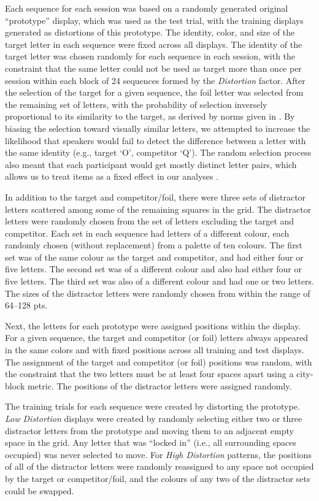 \documentclass[natbib,doc,a4paper]{apa6}
\begin{document}
Each sequence for each session was based on a randomly generated original ``prototype'' display, which was used as the test trial, with the training displays generated as distortions of this prototype.  The identity, color, and size of the target letter in each sequence were fixed across all displays. The identity of the target letter was chosen randomly for each sequence in each session, with the constraint that the same letter could not be used as target more than once per session within each block of 24 sequences formed by the \emph{Distortion} factor. After the selection of the target for a given sequence, the foil letter was selected from the remaining set of letters, with the probability of selection inversely proportional to its similarity to the target, as derived by norms given in \cite{simpson2013letter}.  By biasing the selection toward visually similar letters, we attempted to increase the likelihood that speakers would fail to detect the difference between a letter with the same identity (e.g., target `O', competitor `Q'). The random selection process also meant that each participant would get mostly distinct letter pairs, which allows us to treat items as a fixed effect in our analyses \citep{clark73}.

In addition to the target and competitor/foil, there were three sets of distractor letters scattered among some of the remaining squares in the grid. The distractor letters were randomly chosen from the set of letters excluding the target and competitor. Each set in each sequence had letters of a different colour, each randomly chosen (without replacement) from a palette of ten colours. The first set was of the same colour as the target and competitor, and had either four or five letters. The second set was of a different colour and also had either four or five letters. The third set was also of a different colour and had one or two letters. The sizes of the distractor letters were randomly chosen from within the range of 64--128 pts. 

Next, the letters for each prototype were assigned positions within the display. For a given sequence, the target and competitor (or foil) letters always appeared in the same colors and with fixed positions across all training and test displays. The assignment of the target and competitor (or foil) positions was random, with the constraint that the two letters must be at least four spaces apart using a city-block metric. The positions of the distractor letters were assigned randomly.

The training trials for each sequence were created by distorting the prototype. \emph{Low Distortion} displays were created by randomly selecting either two or three distractor letters from the prototype and moving them to an adjacent empty space in the grid. Any letter that was ``locked in'' (i.e., all surrounding spaces occupied) was never selected to move.  For \emph{High Distortion} patterns, the positions of all of the distractor letters were randomly reassigned to any space not occupied by the target or competitor/foil, and the colours of any two of the distractor sets could be swapped. 
\end{document}
